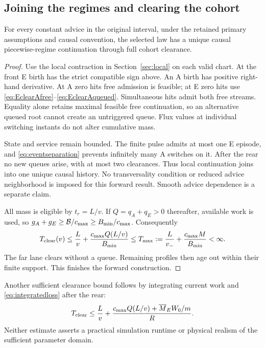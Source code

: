\subsection{Joining the regimes and clearing the cohort}
\begin{theorem}
For every constant advice in the original interval, under the retained
primary assumptions and causal convention, the selected law has a unique
causal piecewise-regime continuation through full cohort clearance.
\end{theorem}
\begin{proof}
Use the local contraction in Section~\ref{sec:local} on each valid chart.
At the front E birth has the strict compatible sign above. An A birth
has positive right-hand derivative. At A zero hits free admission is
feasible; at E zero hits use \eqref{eq:EclearAfree}--\eqref{eq:EclearAqueued}.
Simultaneous hits admit both free streams. Equality alone retains maximal
feasible free continuation, so an alternative queued root cannot create
an untriggered queue. Flux values at individual switching instants do not
alter cumulative mass.

State and service remain bounded. The finite pulse admits at most one E
episode, and \eqref{eq:eventseparation} prevents infinitely many A switches
on it. After the rear no new queues arise, with at most two clearances.
Thus local continuation joins into one unique causal history. No
transversality condition or reduced advice neighborhood is imposed for
this forward result. Smooth advice dependence is a separate claim.

All mass is eligible by $t_r=L/v$. If $Q=q_A+q_E>0$ thereafter, available
work is used, so
$g_A+g_E\geq\mathcal B/c_{\max}\geq B_{\min}/c_{\max}$.
Consequently
\begin{equation}
 T_{\rm clear}(v)\leq\frac Lv+
 \frac{c_{\max}Q(L/v)}{B_{\min}}
 \leq T_{\max}:=\frac L{v_-}+\frac{c_{\max}M}{B_{\min}}<\infty.
 \label{eq:clearance}
\end{equation}
The far lane clears without a queue. Remaining profiles then age out
within their finite support. This finishes the forward construction.
\end{proof}
Another sufficient clearance bound follows by integrating current work
and \eqref{eq:integratedloss} after the rear:
\begin{equation}
 T_{\rm clear}\leq\frac Lv+
 \frac{c_{\max}Q(L/v)+\overline M_EW_0/m}{R}.
 \label{eq:clearancearea}
\end{equation}
Neither estimate asserts a practical simulation runtime or physical realism
of the sufficient parameter domain.


